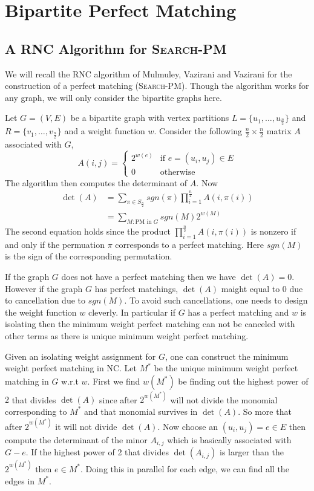 \chapter{Bipartite Perfect Matching}
\section{A \textsc{RNC} Algorithm for \textsc{Search-PM}}\label{rnc-bipartite-pm}
We will recall the \textsc{RNC} algorithm of Mulmuley, Vazirani and Vazirani \cite{MulmuleyVaziraniVazirani_1987_Mia_CONF} for the construction of a perfect matching (\textsc{Search-PM}). Though the algorithm works for any graph, we will only consider the bipartite graphs here.

Let $G=(V,E)$ be a bipartite graph with vertex partitions $L=\{u_1,\dots, u_{\frac{n}{2}}\}$ and $R=\{v_1,\dots, v_{\frac{n}2}\}$ and a weight function $w$. Consider the following $\frac{n}2\times \frac{n}{2}$ matrix $A$ associated with $G$, \[
	 A(i,j)=\begin{cases}
	 2^{w(e)} & \text{if $e=(u_i,u_j)\in E$}\\
	 0 & \text{otherwise}
	 \end{cases}
\]
The algorithm then computes the determinant of $A$. Now \begin{align*}
\det(A) & = \sum\limits_{\pi\in S_{\frac{n }{2}}}^{} sgn(\pi)\prod_{i=1}^{\frac{n }{2}} A(i,\pi(i))\\ & = \sum\limits_{M:\text{PM in $G$}}^{}sgn(M)2^{w(M)} 
\end{align*}
The second equation holds since the product $\prod\limits_{i=1}^{\frac{n}2} A(i,\pi(i))$ is nonzero if and only if the permuation $\pi$ corresponds to a perfect matching. Here $sgn(M)$ is the sign of the corresponding permutation. 

If the graph $G$ does not have a perfect matching then we have $\det(A)=0$. However if the graph $G$ has perfect matchings, $\det(A)$ maight equal to 0 due to cancellation due to $sgn(M)$. To avoid such cancellations, one needs to design the weight function $w$ cleverly. In particular if $G$ has a perfect matching and $w$ is isolating then the  minimum weight perfect matching can not be canceled with other terms as there is unique minimum weight perfect matching. 

Given an isolating weight assignment for $G$, one can construct the minimum weight perfect matching in \textsc{NC}. Let $M^*$ be the unique minimum weight perfect matching in $G$ w.r.t $w$. First we find $w(M^*)$ be finding out the highest power of $2$ that divides $\det(A)$ since  after $2^{w(M^*)}$ will not divide the monomial corresponding to $M^*$ and that monomial survives in $\det(A)$. So more that after $2^{w(M^*)}$ it will not divide $\det(A)$. Now choose an $(u_i,u_j)=e\in E$ then compute the determinant of the minor $A_{i,j}$ which is basically associated with $G-e$. If the highest power of 2 that divides $\det(A_{i,j})$ is larger than the $2^{w(M^*)}$ then $e\in M^*$. Doing this in parallel for each edge, we can find all the edges in $M^*$. 

